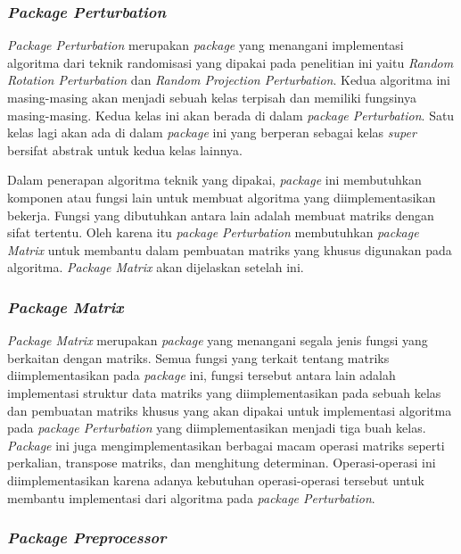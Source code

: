 \subsubsection{\textit{Package Perturbation}}
\label{subsubsec:package-perturbation}

\textit{Package Perturbation} merupakan \textit{package} yang menangani implementasi algoritma dari teknik randomisasi yang dipakai pada penelitian ini yaitu \textit{Random Rotation Perturbation} dan \textit{Random Projection Perturbation}. Kedua algoritma ini masing-masing akan menjadi sebuah kelas terpisah dan memiliki fungsinya masing-masing. Kedua kelas ini akan berada di dalam \textit{package Perturbation}. Satu kelas lagi akan ada di dalam \textit{package} ini yang berperan sebagai kelas \textit{super} bersifat abstrak untuk kedua kelas lainnya.

Dalam penerapan algoritma teknik yang dipakai, \textit{package} ini membutuhkan komponen atau fungsi lain untuk membuat algoritma yang diimplementasikan bekerja. Fungsi yang dibutuhkan antara lain adalah membuat matriks dengan sifat tertentu. Oleh karena itu \textit{package Perturbation} membutuhkan \textit{package Matrix} untuk membantu dalam pembuatan matriks yang khusus digunakan pada algoritma. \textit{Package Matrix} akan dijelaskan setelah ini.

\subsubsection{\textit{Package Matrix}}
\label{subsubsec:package-perturbation}

\textit{Package Matrix} merupakan \textit{package} yang menangani segala jenis fungsi yang berkaitan dengan matriks. Semua fungsi yang terkait tentang matriks diimplementasikan pada \textit{package} ini, fungsi tersebut antara lain adalah implementasi struktur data matriks yang diimplementasikan pada sebuah kelas dan pembuatan matriks khusus yang akan dipakai untuk implementasi algoritma pada \textit{package Perturbation} yang diimplementasikan menjadi tiga buah kelas. \textit{Package} ini juga mengimplementasikan berbagai macam operasi matriks seperti perkalian, transpose matriks, dan menghitung determinan. Operasi-operasi ini diimplementasikan karena adanya kebutuhan operasi-operasi tersebut untuk membantu implementasi dari algoritma pada \textit{package Perturbation}.

\subsubsection{\textit{Package Preprocessor}}
\label{subsubsec:package-preprocessor}

